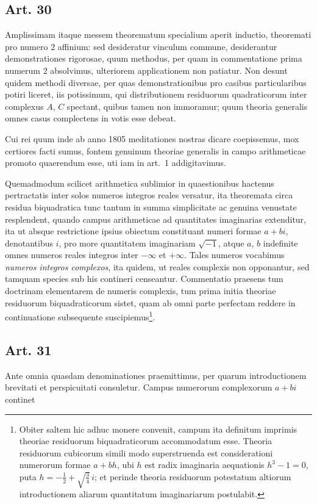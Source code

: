 \documentclass[12pt]{article}
\newcommand{\art}[1]{\subsection*{Art. #1}}
\begin{document}
\clearpage
\art{30}

Amplissimam itaque messem theorematum specialium aperit inductio, theoremati pro numero $2$ affinium: sed desideratur vinculum commune, desiderantur demonstrationes rigorosae, quum methodus, per quam in commentatione prima numerum $2$ absolvimus, ulteriorem applicationem non patiatur. Non desunt quidem methodi diversae, per quas demonstrationibus pro casibus particularibus potiri liceret, iis potissimum, qui distributionem residuorum quadraticorum inter complexus $A$, $C$ spectant, quibus tamen non immoramur; quum theoria generalis omnes casus complectens in votis esse debeat.

Cui rei quum inde ab anno 1805 meditationes nostras dicare coepissemus, mox certiores facti sumus, fontem genuinum theoriae generalis in campo arithmeticae promoto quaerendum esse, uti iam in art.~1 addigitavimus.

Quemadmodum scilicet arithmetica sublimior in quaestionibus hactenus pertractatis inter solos numeros integros reales versatur, ita theoremata circa residua biquadratica tunc tantum in summa simplicitate ac genuina venustate resplendent, quando campus arithmeticae ad quantitates imaginarias extenditur, ita ut absque restrictione ipsius obiectum constituant numeri formae $a+bi$, denotantibus $i$, pro more quantitatem imaginariam $\sqrt{-1}$, atque $a$, $b$ indefinite omnes numeros reales integros inter $-\infty$ et $+\infty$. Tales numeros vocabimus \textit{numeros integros complexos}, ita quidem, ut reales complexis non opponantur, sed tamquam species sub his contineri censeantur. Commentatio praesens tum doctrinam elementarem de numeris complexis, tum prima initia theoriae residuorum biquadraticorum sistet, quam ab omni parte perfectam reddere in continuatione subsequente suscipiemus\footnote{Obiter saltem hic adhuc monere convenit, campum ita definitum imprimis theoriae residuorum biquadraticorum accommodatum esse. Theoria residuorum cubicorum simili modo superstruenda est considerationi numerorum formae $a+bh$, ubi $h$ est radix imaginaria aequationis $h^3-1=0$, puta $h=-\frac{1}{2}+\sqrt{\frac{3}{4}}\,i$; et perinde theoria residuorum potestatum altiorum introductionem aliarum quantitatum imaginariarum postulabit.}.

\art{31}

Ante omnia quasdam denominationes praemittimus, per quarum introductionem brevitati et perspicuitati consuletur. Campus numerorum complexorum $a+bi$ continet
\end{document}
